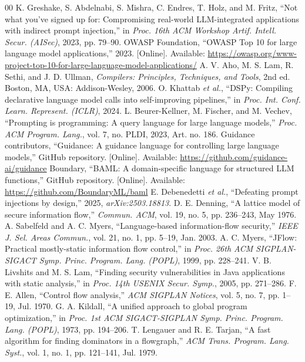 \documentclass[conference]{IEEEtran}
\begin{document}
\begin{thebibliography}{00}
 K. Greshake, S. Abdelnabi, S. Mishra, C. Endres, T. Holz, and M. Fritz, ``Not what you've signed up for: Compromising real-world LLM-integrated applications with indirect prompt injection,'' in \emph{Proc. 16th ACM Workshop Artif. Intell. Secur. (AISec)}, 2023, pp. 79--90.
 OWASP Foundation, ``OWASP Top 10 for large language model applications,'' 2023. [Online]. Available: \url{https://owasp.org/www-project-top-10-for-large-language-model-applications/}
 A. V. Aho, M. S. Lam, R. Sethi, and J. D. Ullman, \emph{Compilers: Principles, Techniques, and Tools}, 2nd ed. Boston, MA, USA: Addison-Wesley, 2006.
 O. Khattab \emph{et al.}, ``DSPy: Compiling declarative language model calls into self-improving pipelines,'' in \emph{Proc. Int. Conf. Learn. Represent. (ICLR)}, 2024.
 L. Beurer-Kellner, M. Fischer, and M. Vechev, ``Prompting is programming: A query language for large language models,'' \emph{Proc. ACM Program. Lang.}, vol. 7, no. PLDI, 2023, Art. no. 186.
 Guidance contributors, ``Guidance: A guidance language for controlling large language models,'' GitHub repository. [Online]. Available: \url{https://github.com/guidance-ai/guidance}
 Boundary, ``BAML: A domain-specific language for structured LLM functions,'' GitHub repository. [Online]. Available: \url{https://github.com/BoundaryML/baml}
 E. Debenedetti \emph{et al.}, ``Defeating prompt injections by design,'' 2025, \emph{arXiv:2503.18813}.
 D. E. Denning, ``A lattice model of secure information flow,'' \emph{Commun. ACM}, vol. 19, no. 5, pp. 236--243, May 1976.
 A. Sabelfeld and A. C. Myers, ``Language-based information-flow security,'' \emph{IEEE J. Sel. Areas Commun.}, vol. 21, no. 1, pp. 5--19, Jan. 2003.
 A. C. Myers, ``JFlow: Practical mostly-static information flow control,'' in \emph{Proc. 26th ACM SIGPLAN-SIGACT Symp. Princ. Program. Lang. (POPL)}, 1999, pp. 228--241.
 V. B. Livshits and M. S. Lam, ``Finding security vulnerabilities in Java applications with static analysis,'' in \emph{Proc. 14th USENIX Secur. Symp.}, 2005, pp. 271--286.
 F. E. Allen, ``Control flow analysis,'' \emph{ACM SIGPLAN Notices}, vol. 5, no. 7, pp. 1--19, Jul. 1970.
 G. A. Kildall, ``A unified approach to global program optimization,'' in \emph{Proc. 1st ACM SIGACT-SIGPLAN Symp. Princ. Program. Lang. (POPL)}, 1973, pp. 194--206.
 T. Lengauer and R. E. Tarjan, ``A fast algorithm for finding dominators in a flowgraph,'' \emph{ACM Trans. Program. Lang. Syst.}, vol. 1, no. 1, pp. 121--141, Jul. 1979.

\end{thebibliography}
\end{document}
